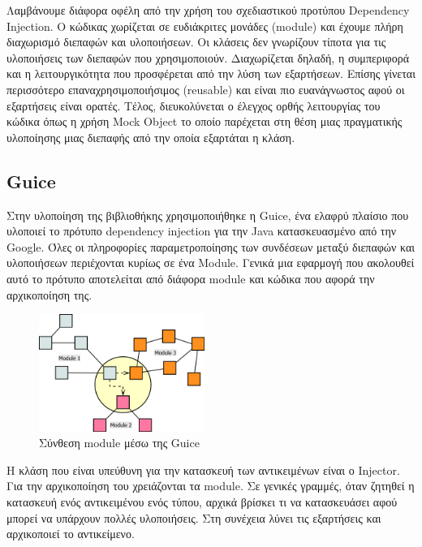Λαμβάνουμε διάφορα οφέλη από την χρήση του σχεδιαστικού προτύπου 
Dependency Injection. Ο κώδικας χωρίζεται σε ευδιάκριτες μονάδες 
(module) και έχουμε πλήρη διαχωρισμό διεπαφών και υλοποιήσεων. Οι 
κλάσεις δεν γνωρίζουν τίποτα για τις υλοποιήσεις των διεπαφών που 
χρησιμοποιούν. Διαχωρίζεται δηλαδή, η συμπεριφορά και η λειτουργικότητα 
που προσφέρεται από την λύση των εξαρτήσεων. Επίσης γίνεται περισσότερο 
επαναχρησιμοποιήσιμος (reusable) και είναι πιο ευανάγνωστος αφού οι 
εξαρτήσεις είναι ορατές. Τέλος, διευκολύνεται ο έλεγχος ορθής 
λειτουργίας του κώδικα όπως η χρήση Mock Object \citep{Freeman04mockroles} 
το οποίο παρέχεται στη θέση μιας πραγματικής υλοποίησης μιας διεπαφής από την 
οποία εξαρτάται η κλάση.

\subsection{Guice}

Στην υλοποίηση της βιβλιοθήκης χρησιμοποιήθηκε η Guice, ένα ελαφρύ 
πλαίσιο που υλοποιεί το πρότυπο dependency injection για την Java 
κατασκευασμένο από την Google. Όλες οι πληροφορίες παραμετροποίησης των 
συνδέσεων μεταξύ διεπαφών και υλοποιήσεων περιέχονται κυρίως σε ένα 
Module. Γενικά μια εφαρμογή που ακολουθεί αυτό το πρότυπο αποτελείται 
από διάφορα module και κώδικα που αφορά την αρχικοποίηση της.

\begin{figure}
  \begin{center}
    \includegraphics[width=0.48\textwidth]{Figures/Guice_modules.png}
  \end{center}
  \caption{Σύνθεση module μέσω της Guice}
  \label{fig:Guice}
\end{figure}

Η κλάση που είναι υπεύθυνη για την κατασκευή των αντικειμένων είναι ο 
Injector. Για την αρχικοποίηση του χρειάζονται τα module. Σε γενικές 
γραμμές, όταν ζητηθεί η κατασκευή ενός αντικειμένου ενός τύπου, αρχικά 
βρίσκει τι να κατασκευάσει αφού μπορεί να υπάρχουν πολλές υλοποιήσεις. 
Στη συνέχεια λύνει τις εξαρτήσεις και αρχικοποιεί το αντικείμενο.

